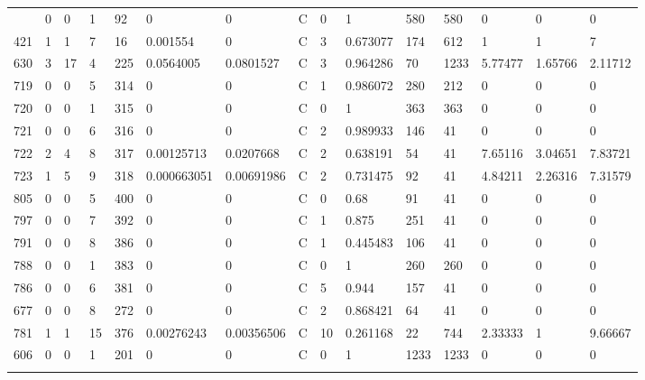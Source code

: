 \begin{latin}
\begin{longtable}{lllllllllllllll}
\begin{comment}
	497 & 0  & 0   & 1  & 92  & 0              & 0              & C & 0  & 1        & 580  & 580  & 0       & 0       & 0       \\
	421 & 1  & 1   & 7  & 16  & 0.001554       & 0              & C & 3  & 0.673077 & 174  & 612  & 1       & 1       & 7       \\
	630 & 3  & 17  & 4  & 225 & 0.0564005      & 0.0801527      & C & 3  & 0.964286 & 70   & 1233 & 5.77477 & 1.65766 & 2.11712 \\
	719 & 0  & 0   & 5  & 314 & 0              & 0              & C & 1  & 0.986072 & 280  & 212  & 0       & 0       & 0       \\
	720 & 0  & 0   & 1  & 315 & 0              & 0              & C & 0  & 1        & 363  & 363  & 0       & 0       & 0       \\
	721 & 0  & 0   & 6  & 316 & 0              & 0              & C & 2  & 0.989933 & 146  & 41   & 0       & 0       & 0       \\
	722 & 2  & 4   & 8  & 317 & 0.00125713     & 0.0207668      & C & 2  & 0.638191 & 54   & 41   & 7.65116 & 3.04651 & 7.83721 \\
	723 & 1  & 5   & 9  & 318 & 0.000663051    & 0.00691986     & C & 2  & 0.731475 & 92   & 41   & 4.84211 & 2.26316 & 7.31579 \\
	805 & 0  & 0   & 5  & 400 & 0              & 0              & C & 0  & 0.68     & 91   & 41   & 0       & 0       & 0       \\
	797 & 0  & 0   & 7  & 392 & 0              & 0              & C & 1  & 0.875    & 251  & 41   & 0       & 0       & 0       \\
	791 & 0  & 0   & 8  & 386 & 0              & 0              & C & 1  & 0.445483 & 106  & 41   & 0       & 0       & 0       \\
	788 & 0  & 0   & 1  & 383 & 0              & 0              & C & 0  & 1        & 260  & 260  & 0       & 0       & 0       \\
	786 & 0  & 0   & 6  & 381 & 0              & 0              & C & 5  & 0.944    & 157  & 41   & 0       & 0       & 0       \\
	677 & 0  & 0   & 8  & 272 & 0              & 0              & C & 2  & 0.868421 & 64   & 41   & 0       & 0       & 0       \\
	781 & 1  & 1   & 15 & 376 & 0.00276243     & 0.00356506     & C & 10 & 0.261168 & 22   & 744  & 2.33333 & 1       & 9.66667 \\
	606 & 0  & 0   & 1  & 201 & 0              & 0              & C & 0  & 1        & 1233 & 1233 & 0       & 0       & 0       \\

\end{comment}
\end{longtable}
\end{latin}
